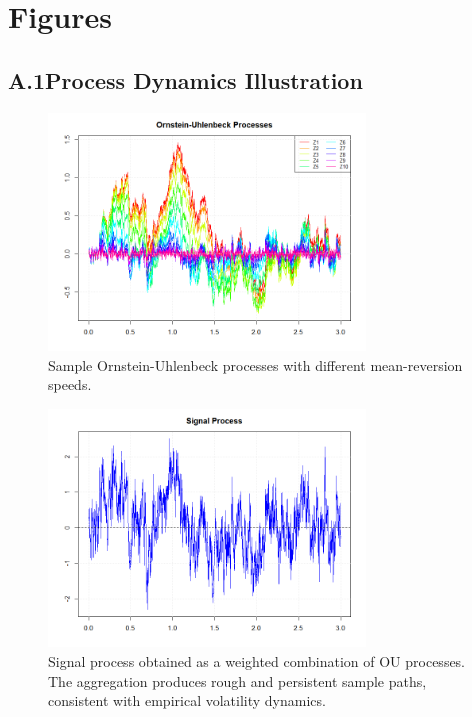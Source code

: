 \section{Figures} \label{sec:Figures}

\subsection*{A.1\quad Process Dynamics Illustration}

\begin{figure}[H]
    \centering
    \includegraphics[width=0.75\textwidth]{figures/A.1 Process Dynamics/ou_processes.png}
    \caption{Sample Ornstein-Uhlenbeck processes with different mean-reversion speeds.}
    \label{fig:OUProcesses}
\end{figure}

\begin{figure}[H]
    \centering
    \includegraphics[width=0.75\textwidth]{figures/A.1 Process Dynamics/signal_process.png}
    \caption{Signal process obtained as a weighted combination of OU processes. The aggregation produces rough and persistent sample paths, consistent with empirical volatility dynamics.}
    \label{fig:SignalProcess}
\end{figure}

